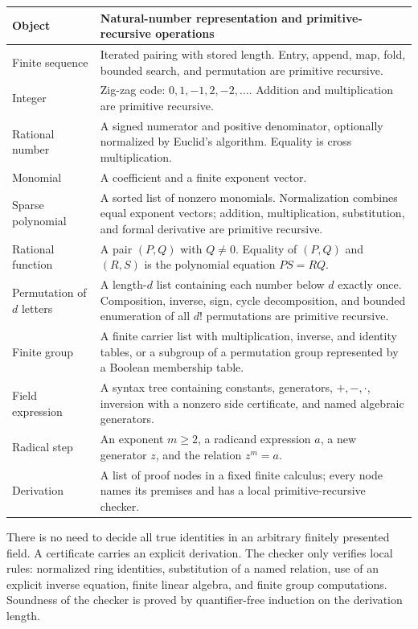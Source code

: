 \begin{longtable}{p{}p{}}
\toprule
Object & Natural-number representation and primitive-recursive operations\\
\midrule
\endhead
Finite sequence & Iterated pairing with stored length.  Entry, append, map,
fold, bounded search, and permutation are primitive recursive.\\
Integer & Zig-zag code: $0,1,-1,2,-2,\ldots$.  Addition and multiplication are
primitive recursive.\\
Rational number & A signed numerator and positive denominator, optionally
normalized by Euclid's algorithm.  Equality is cross multiplication.\\
Monomial & A coefficient and a finite exponent vector.\\
Sparse polynomial & A sorted list of nonzero monomials.  Normalization combines
equal exponent vectors; addition, multiplication, substitution, and formal
derivative are primitive recursive.\\
Rational function & A pair $(P,Q)$ with $Q\ne0$.  Equality of $(P,Q)$ and
$(R,S)$ is the polynomial equation $PS=RQ$.\\
Permutation of $d$ letters & A length-$d$ list containing each number below
$d$ exactly once.  Composition, inverse, sign, cycle decomposition, and
bounded enumeration of all $d!$ permutations are primitive recursive.\\
Finite group & A finite carrier list with multiplication, inverse, and identity
tables, or a subgroup of a permutation group represented by a Boolean
membership table.\\
Field expression & A syntax tree containing constants, generators, $+,-,\cdot$,
inversion with a nonzero side certificate, and named algebraic generators.\\
Radical step & An exponent $m\ge2$, a radicand expression $a$, a new generator
$z$, and the relation $z^m=a$.\\
Derivation & A list of proof nodes in a fixed finite calculus; every node names
its premises and has a local primitive-recursive checker.\\
\bottomrule
\end{longtable}

There is no need to decide all true identities in an arbitrary finitely
presented field.  A certificate carries an explicit derivation.  The checker
only verifies local rules: normalized ring identities, substitution of a
named relation, use of an explicit inverse equation, finite linear algebra,
and finite group computations.  Soundness of the checker is proved by
quantifier-free induction on the derivation length.

